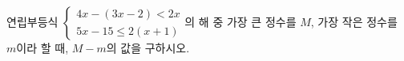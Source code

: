 연립부등식 $\begin{cases} 4x-(3x-2)<2x \\ 5x-15\le 2(x+1) \end{cases}$의 해 중 가장 큰 정수를 $M$, 가장 작은 정수를 $m$이라 할 때, $M-m$의 값을 구하시오.
